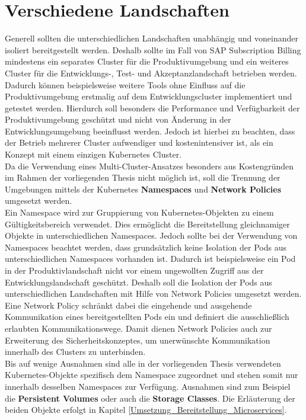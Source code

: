 \section{Verschiedene Landschaften}
\label{Konzeption_Landschaften}
Generell sollten die unterschiedlichen Landschaften unabhängig und voneinander isoliert bereitgestellt werden. Deshalb sollte im Fall von SAP Subscription Billing mindestens ein separates Cluster für die Produktivumgebung und ein weiteres Cluster für die Entwicklungs-, Test- und Akzeptanzlandschaft betrieben werden. Dadurch können beispielsweise weitere Tools ohne Einfluss auf die Produktivumgebung erstmalig auf dem Entwicklungscluster implementiert und getestet werden. Hierdurch soll besonders die Performance und Verfügbarkeit der Produktivumgebung geschützt und nicht von Änderung in der Entwicklungsumgebung beeinflusst werden.
Jedoch ist hierbei zu beachten, dass der Betrieb mehrerer Cluster aufwendiger und kostenintensiver ist, als ein Konzept mit einem einzigen Kubernetes Cluster. \\
Da die Verwendung eines Multi-Cluster-Ansatzes besonders aus Kostengründen im Rahmen der vorliegenden Thesis nicht möglich ist, soll die Trennung der Umgebungen mittels der Kubernetes \textbf{Namespaces} und \textbf{Network Policies} umgesetzt werden.\\
Ein Namespace wird zur Gruppierung von Kubernetes-Objekten zu einem Gültigkeitsbereich verwendet. Dies ermöglicht die Bereitstellung gleichnamiger Objekte in unterschiedlichen Namespaces. Jedoch sollte bei der Verwendung von Namespaces beachtet werden, dass grundsätzlich keine Isolation der Pods aus unterschiedlichen Namespaces vorhanden ist. Dadurch ist beispielsweise ein Pod in der Produktivlandschaft nicht vor einem ungewollten Zugriff aus der Entwicklungslandschaft geschützt. Deshalb soll die Isolation der Pods aus unterschiedlichen Landschaften mit Hilfe von Network Policies umgesetzt werden. Eine Network Policy schränkt dabei die eingehende und ausgehende Kommunikation eines bereitgestellten Pods ein und definiert die ausschließlich erlaubten Kommunikationswege. Damit dienen Network Policies auch zur Erweiterung des Sicherheitskonzeptes, um unerwünschte Kommunikation innerhalb des Clusters zu unterbinden.\autocite[Vgl.][Network Policies
]{KubernetesAuthors.20200207}\\
Bis auf wenige Ausnahmen sind alle in der vorliegenden Thesis verwendeten Kubernetes-Objekte spezifisch dem Namespace zugeordnet und stehen somit nur innerhalb desselben Namespaces zur Verfügung. Ausnahmen sind zum Beispiel die \textbf{Persistent Volumes} oder auch die \textbf{Storage Classes}. Die Erläuterung der beiden Objekte erfolgt in Kapitel \ref{Umsetzung_Bereitstellung_Microservices}.\\
